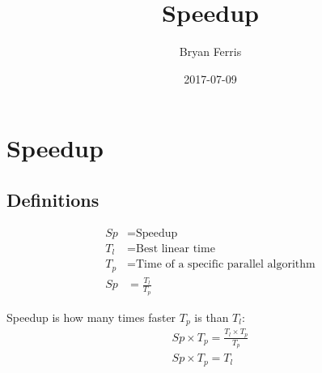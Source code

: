 \documentclass{standalone}
\title{Speedup}
\date{2017-07-09}
\author{Bryan Ferris}
\begin{document}
\ifstandalone
\maketitle
\fi

\section{Speedup}

\subsection{Definitions}
\begin{align*}
	Sp &= \text{Speedup}\\
	T_l &= \text{Best linear time}\\
	T_p &= \text{Time of a specific parallel algorithm}\\
	Sp &= \frac{T_l}{T_p}
\end{align*}

Speedup is how many times faster $T_p$ is than $T_l$:
\begin{align*}
	Sp \times T_p = \frac{T_l \times T_p}{T_p}\\
	Sp \times T_p = T_l
\end{align*}
\end{document}
